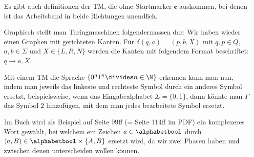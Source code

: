 Es gibt auch definitionen der TM, die ohne Startmarker $\cent$ auskommen, bei denen ist das Arbeitsband in beide Richtungen unendlich.

Graphisch stellt man Turingmaschinen folgendermassen dar:
Wir haben wieder einen Graphen mit gerichteten Kanten.
Für $\delta(q, a) = (p, b, X)$ mit $q, p \in Q$, $a, b \in \Sigma$ und $X \in \{ L, R, N \}$ werden die Kanten mit folgendem Format beschriftet:
$q \rightarrow a, X$.

Mit einem TM die Sprache $\{ 0^n 1^n \divides n \in \N \}$ erkennen kann man nun, indem man jeweils das linkeste und rechteste Symbol durch ein anderes Symbol ersetzt,
beispielsweise, wenn das Eingabealphabet $\Sigma = \{ 0, 1 \}$, dann könnte man $\Gamma$ das Symbol $2$ hinzufügen, mit dem man jedes bearbeitete Symbol ersetzt.

Im Buch wird als Beispiel auf Seite 99ff (= Seite 114ff im PDF) ein komplexeres Wort gewählt, 
bei welchem ein Zeichen $a \in \alphabetbool$ durch $(a, B) \in \alphabetbool \times \{ A, B \}$ ersetzt wird, 
da wir zwei Phasen haben und zwischen denen unterscheiden wollen können.

